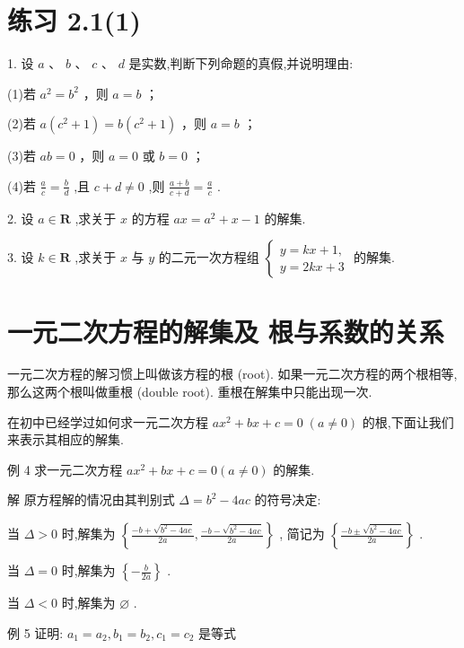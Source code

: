 \documentclass[10pt]{article}
\begin{document}
\section*{练习 2.1(1)}

1. 设 \(a\text{ 、 }b\text{ 、 }c\text{ 、 }d\) 是实数,判断下列命题的真假,并说明理由:

(1)若 \({a}^{2} = {b}^{2}\) ，则 \(a = b\) ；

(2)若 \(a\left( {{c}^{2} + 1}\right)  = b\left( {{c}^{2} + 1}\right)\) ，则 \(a = b\) ；

(3)若 \({ab} = 0\) ，则 \(a = 0\) 或 \(b = 0\) ；

(4)若 \(\frac{a}{c} = \frac{b}{d}\) ,且 \(c + d \neq  0\) ,则 \(\frac{a + b}{c + d} = \frac{a}{c}\) .

2. 设 \(a \in  \mathbf{R}\) ,求关于 \(x\) 的方程 \({ax} = {a}^{2} + x - 1\) 的解集.

3. 设 \(k \in  \mathbf{R}\) ,求关于 \(x\) 与 \(y\) 的二元一次方程组 \(\left\{  \begin{array}{l} y = {kx} + 1, \\  y = {2kx} + 3 \end{array}\right.\) 的解集.

\section*{一元二次方程的解集及 根与系数的关系}

一元二次方程的解习惯上叫做该方程的根 (root). 如果一元二次方程的两个根相等, 那么这两个根叫做重根 (double root). 重根在解集中只能出现一次.

在初中已经学过如何求一元二次方程 \(a{x}^{2} + {bx} + c = 0 \; \left( {a \neq  0}\right)\) 的根,下面让我们来表示其相应的解集.

例 4 求一元二次方程 \(a{x}^{2} + {bx} + c = 0\left( {a \neq  0}\right)\) 的解集.

解 原方程解的情况由其判别式 \(\Delta  = {b}^{2} - {4ac}\) 的符号决定:

当 \(\Delta  > 0\) 时,解集为 \(\left\{  {\frac{-b + \sqrt{{b}^{2} - {4ac}}}{2a},\frac{-b - \sqrt{{b}^{2} - {4ac}}}{2a}}\right\}\) , 简记为 \(\left\{  \frac{-b \pm  \sqrt{{b}^{2} - {4ac}}}{2a}\right\}\) .

当 \(\Delta  = 0\) 时,解集为 \(\left\{  {-\frac{b}{2a}}\right\}\) .

当 \(\Delta  < 0\) 时,解集为 \(\varnothing\) .

例 5 证明: \({a}_{1} = {a}_{2},{b}_{1} = {b}_{2},{c}_{1} = {c}_{2}\) 是等式
\end{document}

